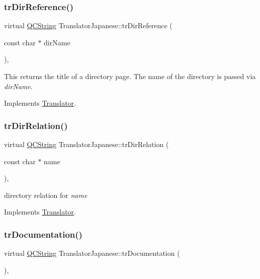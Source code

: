 \subsubsection{\texorpdfstring{trDirReference()}{trDirReference()}}
{\footnotesize\ttfamily virtual \mbox{\hyperlink{class_q_c_string}{Q\+C\+String}} Translator\+Japanese\+::tr\+Dir\+Reference (\begin{DoxyParamCaption}\item[{const char $\ast$}]{dir\+Name }\end{DoxyParamCaption})\hspace{0.3cm}{\ttfamily [inline]}, {\ttfamily [virtual]}}

This returns the title of a directory page. The name of the directory is passed via {\itshape dir\+Name}. 

Implements \mbox{\hyperlink{class_translator}{Translator}}.

\mbox{\label{class_translator_japanese_a6439a677a30660562565a37df3469aff}} 
\subsubsection{\texorpdfstring{trDirRelation()}{trDirRelation()}}
{\footnotesize\ttfamily virtual \mbox{\hyperlink{class_q_c_string}{Q\+C\+String}} Translator\+Japanese\+::tr\+Dir\+Relation (\begin{DoxyParamCaption}\item[{const char $\ast$}]{name }\end{DoxyParamCaption})\hspace{0.3cm}{\ttfamily [inline]}, {\ttfamily [virtual]}}

directory relation for {\itshape name} 

Implements \mbox{\hyperlink{class_translator}{Translator}}.

\mbox{\label{class_translator_japanese_abd15dfd03f03cf0b753eeedb43a3b7eb}} 
\subsubsection{\texorpdfstring{trDocumentation()}{trDocumentation()}}
{\footnotesize\ttfamily virtual \mbox{\hyperlink{class_q_c_string}{Q\+C\+String}} Translator\+Japanese\+::tr\+Documentation (\begin{DoxyParamCaption}{ }\end{DoxyParamCaption})\hspace{0.3cm}{\ttfamily [inline]}, {\ttfamily [virtual]}}

